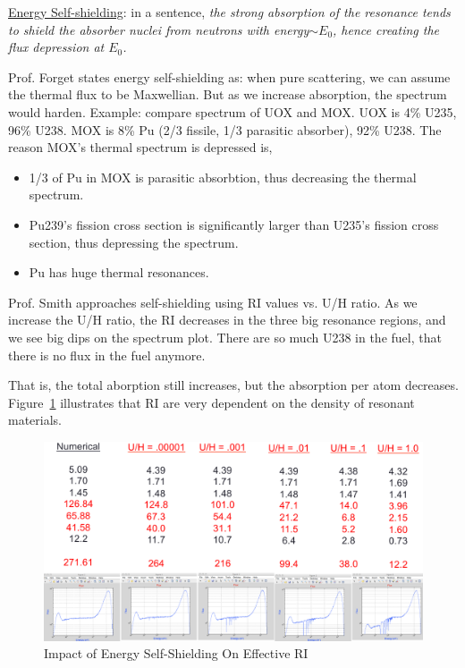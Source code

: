 \documentclass{school-22.211-notes}
\begin{document}
\uline{Energy Self-shielding}: in a sentence, \textit{the strong absorption of the resonance tends to shield the absorber nuclei from neutrons with energy$\sim E_0$, hence creating the flux depression at $E_0$.}

Prof. Forget states energy self-shielding as: when pure scattering, we can assume the thermal flux to be Maxwellian. But as we increase absorption, the spectrum would harden. Example: compare spectrum of UOX and MOX. UOX is 4\% U235, 96\% U238. MOX is 8\% Pu (2/3 fissile, 1/3 parasitic absorber), 92\% U238. The reason MOX's thermal spectrum is depressed is, 
\begin{itemize}
\item 1/3 of Pu in MOX is parasitic absorbtion, thus decreasing the thermal spectrum. 
\item Pu239's fission cross section is significantly larger than U235's fission cross section, thus depressing the spectrum.
\item Pu has huge thermal resonances. 
\end{itemize}


Prof. Smith approaches self-shielding using RI values vs. U/H ratio. As we increase the U/H ratio, the RI decreases in the three big resonance regions, and we see big dips on the spectrum plot. There are so much U238 in the fuel, that there is no flux in the fuel anymore. 

 That is, the total aborption still increases, but the absorption per atom decreases. Figure~\ref{energy-self-shielding} illustrates that RI are very dependent on the density of resonant materials.
\begin{figure}
  \centering
  \includegraphics[width=4.5in]{images/r-m/self-shielding.png}
  \caption{Impact of Energy Self-Shielding On Effective RI} \label{energy-self-shielding}
\end{figure}
\end{document}

